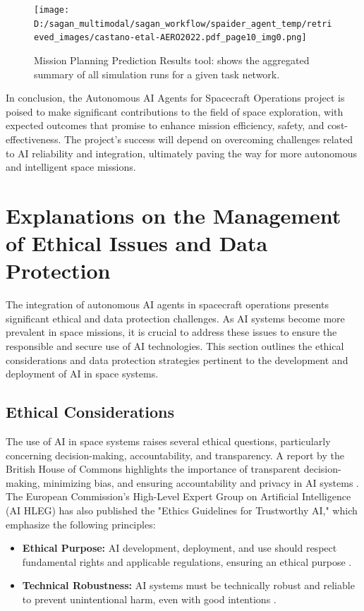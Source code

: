 \documentclass[a4paper, 11pt]{article}
\begin{document}
\begin{figure}[htbp]
    \centering
    \texttt{[image: D:/sagan\_multimodal/sagan\_workflow/spaider\_agent\_temp/retrieved\_images/castano-etal-AERO2022.pdf\_page10\_img0.png]}
    \caption{Mission Planning Prediction Results tool: shows the aggregated summary of all simulation runs for a given task network.}
    \label{fig:mission-planning-prediction}
\end{figure}

In conclusion, the Autonomous AI Agents for Spacecraft Operations project is poised to make significant contributions to the field of space exploration, with expected outcomes that promise to enhance mission efficiency, safety, and cost-effectiveness. The project's success will depend on overcoming challenges related to AI reliability and integration, ultimately paving the way for more autonomous and intelligent space missions.
\section{Explanations on the Management of Ethical Issues and Data Protection}

The integration of autonomous AI agents in spacecraft operations presents significant ethical and data protection challenges. As AI systems become more prevalent in space missions, it is crucial to address these issues to ensure the responsible and secure use of AI technologies. This section outlines the ethical considerations and data protection strategies pertinent to the development and deployment of AI in space systems.

\subsection{Ethical Considerations}

The use of AI in space systems raises several ethical questions, particularly concerning decision-making, accountability, and transparency. A report by the British House of Commons highlights the importance of transparent decision-making, minimizing bias, and ensuring accountability and privacy in AI systems \cite{house_of_commons_report}. The European Commission's High-Level Expert Group on Artificial Intelligence (AI HLEG) has also published the "Ethics Guidelines for Trustworthy AI," which emphasize the following principles:

\begin{itemize}
    \item \textbf{Ethical Purpose:} AI development, deployment, and use should respect fundamental rights and applicable regulations, ensuring an ethical purpose \cite{ai_hleg_guidelines}.
    \item \textbf{Technical Robustness:} AI systems must be technically robust and reliable to prevent unintentional harm, even with good intentions \cite{ai_hleg_guidelines}.
\end{itemize}
\end{document}
